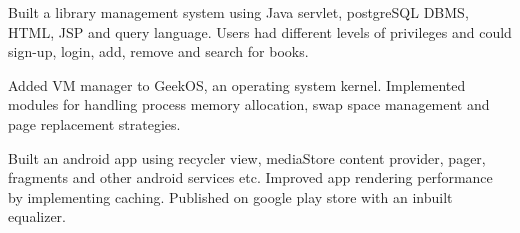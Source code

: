 



\begin{cventries}

  \cvproject
    {
      \begin{cvitems} %
         \item{ Built a library management system using Java servlet, postgreSQL DBMS, HTML, JSP and query language. Users  had different levels of privileges and could sign-up, login, add, remove and search for books.}
		\item{ Added VM manager to GeekOS, an operating system kernel. Implemented modules for handling process memory allocation, swap space management and page replacement strategies. }
        \item{ Built an android app using recycler view, mediaStore content provider, pager, fragments and other android services etc. Improved app rendering performance by implementing caching. Published on google play store with an inbuilt equalizer.}
      \end{cvitems}
    }

\end{cventries}